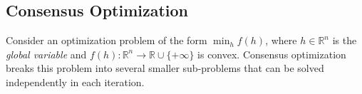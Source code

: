 \documentclass[letterpaper]{article} %
\DeclareMathOperator*{\argmin}{argmin}
\newcommand{\norm}[1]{\left\lVert #1 \right\rVert}
\begin{document}
\subsection{Consensus Optimization}
\label{sec:consOpt}

Consider an optimization problem of the form $\min_h f(h)$, where
$h\in\mathbb{R}^n$ is the \textit{global variable} and
$f(h):\mathbb{R}^n \rightarrow \mathbb{R}\cup \{+\infty\}$ is
convex. Consensus optimization breaks this problem
into several smaller sub-problems that can be solved independently in
each iteration.  
\end{document}
